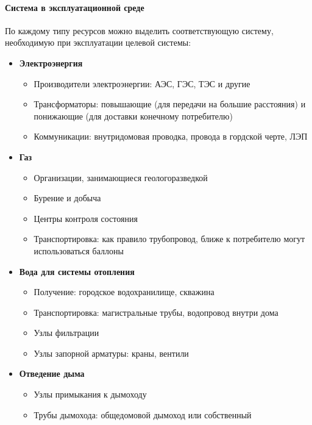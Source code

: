 \documentclass[bibliography=totocnumbered]{scrartcl}
\begin{document}
\paragraph{Система в эксплуатационной среде}
По каждому типу ресурсов можно выделить соответствующую систему, необходимую при эксплуатации целевой системы:

\begin{itemize}
    \item
    \textbf{Электроэнергия}
    \begin{itemize}
        \item Производители электроэнергии: АЭС, ГЭС, ТЭС и другие
        \item Трансформаторы: повышающие (для передачи на большие расстояния) и понижающие (для доставки конечному потребителю)   
        \item Коммуникации: внутридомовая проводка, провода в гордской черте, ЛЭП
    \end{itemize}
    
    \item
    \textbf{Газ}
    \begin{itemize}
        \item Организации, занимающиеся геологоразведкой
        \item Бурение и добыча
        \item Центры контроля состояния
        \item Транспортировка: как правило трубопровод, ближе к потребителю могут использоваться баллоны
    \end{itemize}
    
    \item
    \textbf{Вода для системы отопления}
    \begin{itemize}
        \item Получение: городское водохранилище, скважина
        \item Транспортировка: магистральные трубы, водопровод внутри дома
        \item Узлы фильтрации
        \item Узлы запорной арматуры: краны, вентили
    \end{itemize}
    
    \item
    \textbf{Отведение дыма}
    \begin{itemize}
        \item Узлы примыкания к дымоходу
        \item Трубы дымохода: общедомовой дымоход или собственный
    \end{itemize}
\end{itemize}
\end{document}
